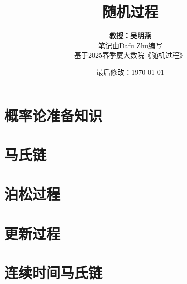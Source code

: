 \documentclass{article}
\title{随机过程}
\author{\textbf{教授：吴明燕} \\ 笔记由Dafu Zhu编写 \\ 基于2025春季厦大数院《随机过程》}
\date{最后修改：\today}
\begin{document}
\maketitle

\tableofcontents
{}

\pagebreak

\section{概率论准备知识}







\pagebreak

\section{马氏链}










\pagebreak

\section{泊松过程}





\pagebreak

\section{更新过程}


\pagebreak

\section{连续时间马氏链}



\end{document}
